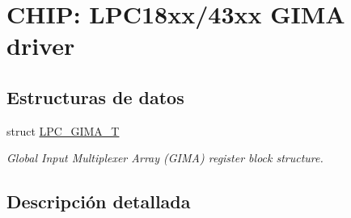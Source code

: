 \hypertarget{group___g_i_m_a__18_x_x__43_x_x}{}\section{C\+H\+IP\+: L\+P\+C18xx/43xx G\+I\+MA driver}
\label{group___g_i_m_a__18_x_x__43_x_x}
\subsection*{Estructuras de datos}
\begin{DoxyCompactItemize}
\item 
struct \hyperlink{struct_l_p_c___g_i_m_a___t}{L\+P\+C\+\_\+\+G\+I\+M\+A\+\_\+T}
\begin{DoxyCompactList}\small\item\em Global Input Multiplexer Array (G\+I\+MA) register block structure. \end{DoxyCompactList}\end{DoxyCompactItemize}


\subsection{Descripción detallada}
